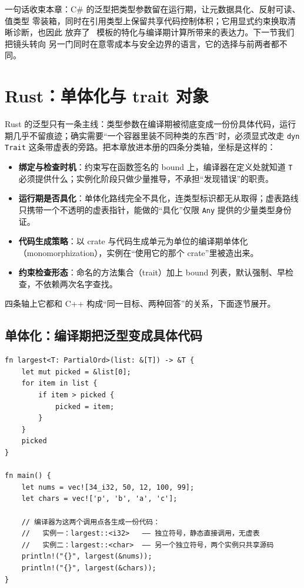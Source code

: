 \documentclass[12pt,a4paper,fontset=fandol]{ctexbook}
\newcommand{\cpplabel}{%
  \tcbox[on line,colback=cppheadbg,colframe=cppheadbg,
    boxrule=0pt,arc=1pt,left=2pt,right=2pt,top=1pt,bottom=1pt,
    colupper=white,fontupper=\scriptsize\bfseries]{C++}}
\newcommand{\cpp}[1]{C++#1}
\newcommand{\kw}[1]{\texttt{#1}}
\begin{document}
一句话收束本章：C\# 的泛型把类型参数留在运行期，让元数据具化、反射可读、值类型
零装箱，同时在引用类型上保留共享代码控制体积；它用显式约束换取清晰诊断，也因此
放弃了 \cpplabel\ 模板的特化与编译期计算所带来的表达力。下一节我们把镜头转向
另一门同时在意零成本与安全边界的语言，它的选择与前两者都不同。

\chapter{Rust：单体化与 trait 对象}

Rust 的泛型只有一条主线：类型参数在编译期被彻底变成一份份具体代码，运行期几乎不留痕迹；确实需要“一个容器里装不同种类的东西”时，必须显式改走 \kw{dyn Trait} 这条带虚表的旁路。把本章放进本册的四条分类轴，坐标是这样的：

\begin{itemize}
  \item \textbf{绑定与检查时机}：约束写在函数签名的 bound 上，编译器在定义处就知道 \kw{T} 必须提供什么；实例化阶段只做少量推导，不承担“发现错误”的职责。
  \item \textbf{运行期是否具化}：单体化路线完全不具化，连类型标识都无从取得；虚表路线只携带一个不透明的虚表指针，能做的“具化”仅限 \kw{Any} 提供的少量类型身份证。
  \item \textbf{代码生成策略}：以 crate 与代码生成单元为单位的编译期单体化（monomorphization），实例在“使用它的那个 crate”里被造出来。
  \item \textbf{约束检查形态}：命名的方法集合（trait）加上 bound 列表，默认强制、早检查，不依赖两次名字查找。
\end{itemize}

四条轴上它都和 \cpp{} 构成“同一目标、两种回答”的关系，下面逐节展开。

\section{单体化：编译期把泛型变成具体代码}

\begin{lstlisting}[style=ruststyle,caption={单体化：同一份 \kw{largest} 源码在 \kw{i32} 与 \kw{char} 下得到两份互不相干的实例}]
fn largest<T: PartialOrd>(list: &[T]) -> &T {
    let mut picked = &list[0];
    for item in list {
        if item > picked {
            picked = item;
        }
    }
    picked
}

fn main() {
    let nums = vec![34_i32, 50, 12, 100, 99];
    let chars = vec!['p', 'b', 'a', 'c'];

    // 编译器为这两个调用点各生成一份代码：
    //   实例一：largest::<i32>   —— 独立符号，静态直接调用，无虚表
    //   实例二：largest::<char>  —— 另一个独立符号，两个实例只共享源码
    println!("{}", largest(&nums));
    println!("{}", largest(&chars));
}
\end{lstlisting}
\end{document}
